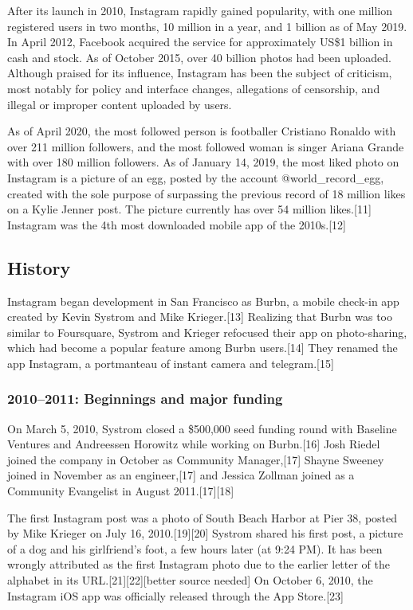 \documentclass[12pt]{article}
\begin{document}
After its launch in 2010, Instagram rapidly gained popularity, with one million registered users in two months, 10 million in a year, and 1 billion as of May 2019. In April 2012, Facebook acquired the service for approximately US\$1 billion in cash and stock. As of October 2015, over 40 billion photos had been uploaded. Although praised for its influence, Instagram has been the subject of criticism, most notably for policy and interface changes, allegations of censorship, and illegal or improper content uploaded by users.

As of April 2020, the most followed person is footballer Cristiano Ronaldo with over 211 million followers, and the most followed woman is singer Ariana Grande with over 180 million followers. As of January 14, 2019, the most liked photo on Instagram is a picture of an egg, posted by the account @world\_record\_egg, created with the sole purpose of surpassing the previous record of 18 million likes on a Kylie Jenner post. The picture currently has over 54 million likes.[11] Instagram was the 4th most downloaded mobile app of the 2010s.[12]





\subsection{History}

Instagram began development in San Francisco as Burbn, a mobile check-in app created by Kevin Systrom and Mike Krieger.[13] Realizing that Burbn was too similar to Foursquare, Systrom and Krieger refocused their app on photo-sharing, which had become a popular feature among Burbn users.[14] They renamed the app Instagram, a portmanteau of instant camera and telegram.[15]




\subsubsection{2010–2011: Beginnings and major funding}


On March 5, 2010, Systrom closed a \$500,000 seed funding round with Baseline Ventures and Andreessen Horowitz while working on Burbn.[16] Josh Riedel joined the company in October as Community Manager,[17] Shayne Sweeney joined in November as an engineer,[17] and Jessica Zollman joined as a Community Evangelist in August 2011.[17][18]

The first Instagram post was a photo of South Beach Harbor at Pier 38, posted by Mike Krieger on July 16, 2010.[19][20] Systrom shared his first post, a picture of a dog and his girlfriend's foot, a few hours later (at 9:24 PM). It has been wrongly attributed as the first Instagram photo due to the earlier letter of the alphabet in its URL.[21][22][better source needed] On October 6, 2010, the Instagram iOS app was officially released through the App Store.[23]
\end{document}
